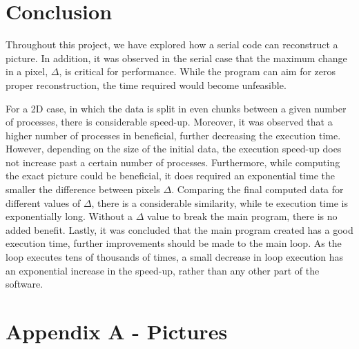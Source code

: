 \documentclass[11pt]{article}
\begin{document}
	\section{Conclusion}
	Throughout this project, we have explored how a serial code can reconstruct a picture. In addition, it was observed in the serial case that the maximum change in a pixel, $\Delta$, is critical for performance. While the program can aim for zeros proper reconstruction, the time required would become unfeasible. 
	
	For a 2D case, in which the data is split in even chunks between a given number of processes, there is considerable speed-up. Moreover, it was observed that a higher number of processes in beneficial, further decreasing the execution time. However, depending on the size of the initial data, the execution speed-up does not increase past a certain number of processes. Furthermore, while computing the exact picture could be beneficial, it does required an exponential time the smaller the difference between pixels $\Delta$. Comparing the final computed data for different values of $\Delta$, there is a considerable similarity, while te execution time is exponentially long. Without a $\Delta$ value to break the main program, there is no added benefit. Lastly, it was concluded that the main program created has a good execution time, further improvements should be made to the main loop. As the loop executes tens of thousands of times, a small decrease in loop execution has an exponential increase in the speed-up, rather than any other part of the software.
	
	

	\pagebreak
	\section{Appendix A - Pictures} \label{ap1}
	
\end{document}
